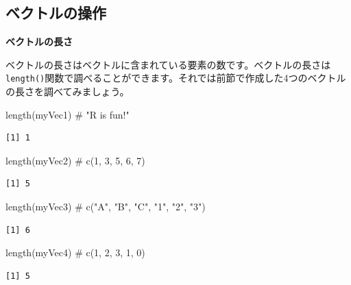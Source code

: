 \documentclass[
  a4paper,
  pandoc,
  ja=standard,
  jafont=haranoaji]{bxjsbook}
\newenvironment{Shaded}{\begin{snugshade}}{\end{snugshade}}
\newcommand{\CommentTok}[1]{\textcolor[rgb]{0.37,0.37,0.37}{#1}}
\newcommand{\FunctionTok}[1]{\textcolor[rgb]{0.28,0.35,0.67}{#1}}
\newcommand{\NormalTok}[1]{\textcolor[rgb]{0.00,0.48,0.65}{#1}}
\begin{document}
\hypertarget{ux30d9ux30afux30c8ux30ebux306eux64cdux4f5c}{%
\subsection{ベクトルの操作}\label{ux30d9ux30afux30c8ux30ebux306eux64cdux4f5c}}

\textbf{ベクトルの長さ}

ベクトルの長さはベクトルに含まれている要素の数です。ベクトルの長さは\texttt{length()}関数で調べることができます。それでは前節で作成した4つのベクトルの長さを調べてみましょう。

\begin{Shaded}
\begin{Highlighting}[numbers=left,,]
\FunctionTok{length}\NormalTok{(myVec1) }\CommentTok{\# "R is fun!"}
\end{Highlighting}
\end{Shaded}

\begin{verbatim}
[1] 1
\end{verbatim}

\begin{Shaded}
\begin{Highlighting}[numbers=left,,]
\FunctionTok{length}\NormalTok{(myVec2) }\CommentTok{\# c(1, 3, 5, 6, 7)}
\end{Highlighting}
\end{Shaded}

\begin{verbatim}
[1] 5
\end{verbatim}

\begin{Shaded}
\begin{Highlighting}[numbers=left,,]
\FunctionTok{length}\NormalTok{(myVec3) }\CommentTok{\# c("A", "B", "C", "1", "2", "3")}
\end{Highlighting}
\end{Shaded}

\begin{verbatim}
[1] 6
\end{verbatim}

\begin{Shaded}
\begin{Highlighting}[numbers=left,,]
\FunctionTok{length}\NormalTok{(myVec4) }\CommentTok{\# c(1, 2, 3, 1, 0)}
\end{Highlighting}
\end{Shaded}

\begin{verbatim}
[1] 5
\end{verbatim}
\end{document}
